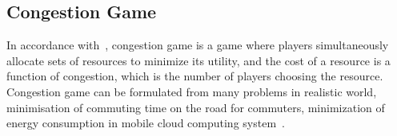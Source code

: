 \subsection{Congestion Game}
In accordance with~\cite{Voecking06congestiongames}, congestion game is a game where players simultaneously allocate sets of resources to minimize its utility, and the cost of a resource is a function of congestion, which is the number of players choosing the resource.
Congestion game can be formulated from many problems in realistic world, \eg minimisation of commuting time on the road for commuters, minimization of energy consumption in mobile cloud computing system~\cite{game_cloudcomputing_energy12}.










